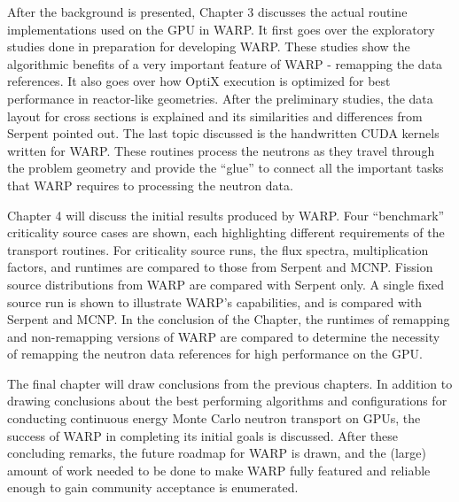 After the background is presented, Chapter 3 discusses the actual routine implementations used on the GPU in WARP.  It first goes over the exploratory studies done in preparation for developing WARP.  These studies show the algorithmic benefits of a very important feature of WARP - remapping the data references.  It also goes over how OptiX execution is optimized for best performance in reactor-like geometries.  After the preliminary studies, the data layout for cross sections is explained and its similarities and differences from Serpent pointed out.  The last topic discussed is the handwritten CUDA kernels written for WARP.  These routines process the neutrons as they travel through the problem geometry and provide the ``glue'' to connect all the important tasks that WARP requires to processing the neutron data.

Chapter 4 will discuss the initial results produced by WARP.  Four ``benchmark'' criticality source cases are shown, each highlighting different requirements of the transport routines.  For criticality source runs, the flux spectra, multiplication factors, and runtimes are compared to those from Serpent and MCNP.  Fission source distributions from WARP are compared with Serpent only.  A single fixed source run is shown to illustrate WARP's capabilities, and is compared with Serpent and MCNP.  In the conclusion of the Chapter, the runtimes of remapping and non-remapping versions of WARP are compared to determine the necessity of remapping the neutron data references for high performance on the GPU.

The final chapter will draw conclusions from the previous chapters.  In addition to drawing conclusions about the best performing algorithms and configurations for conducting continuous energy Monte Carlo neutron transport on GPUs, the success of WARP in completing its initial goals is discussed.  After these concluding remarks, the future roadmap for WARP is drawn, and the (large) amount of work needed to be done to make WARP fully featured and reliable enough to gain community acceptance is enumerated.





